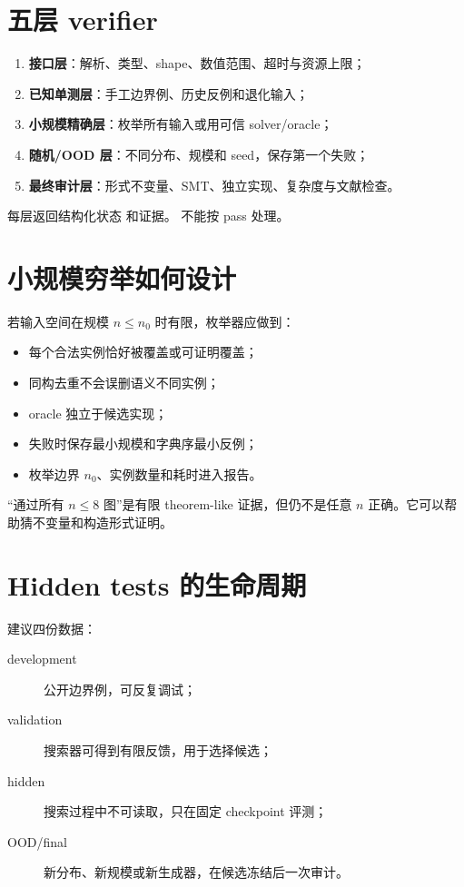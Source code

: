 \section{五层 verifier}

\begin{enumerate}
  \item \textbf{接口层}：解析、类型、shape、数值范围、超时与资源上限；
  \item \textbf{已知单测层}：手工边界例、历史反例和退化输入；
  \item \textbf{小规模精确层}：枚举所有输入或用可信 solver/oracle；
  \item \textbf{随机/OOD 层}：不同分布、规模和 seed，保存第一个失败；
  \item \textbf{最终审计层}：形式不变量、SMT、独立实现、复杂度与文献检查。
\end{enumerate}

每层返回结构化状态  和证据。 不能按 pass 处理。

\section{小规模穷举如何设计}

若输入空间在规模 $n\le n_0$ 时有限，枚举器应做到：
\begin{itemize}
  \item 每个合法实例恰好被覆盖或可证明覆盖；
  \item 同构去重不会误删语义不同实例；
  \item oracle 独立于候选实现；
  \item 失败时保存最小规模和字典序最小反例；
  \item 枚举边界 $n_0$、实例数量和耗时进入报告。
\end{itemize}

“通过所有 $n\le8$ 图”是有限 theorem-like 证据，但仍不是任意 $n$ 正确。它可以帮助猜不变量和构造形式证明。

\section{Hidden tests 的生命周期}

建议四份数据：
\begin{description}
  \item[development] 公开边界例，可反复调试；
  \item[validation] 搜索器可得到有限反馈，用于选择候选；
  \item[hidden] 搜索过程中不可读取，只在固定 checkpoint 评测；
  \item[OOD/final] 新分布、新规模或新生成器，在候选冻结后一次审计。
\end{description}

